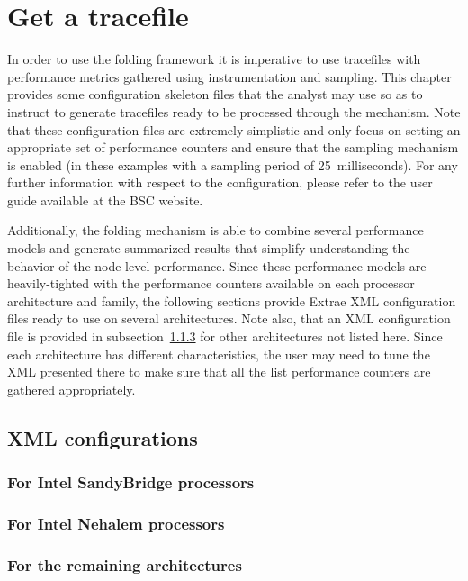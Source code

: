 \chapter{Get a tracefile}\label{cha:GetATrace}

In order to use the folding framework it is imperative to use tracefiles with performance metrics gathered using instrumentation and sampling.
This chapter provides some \TRACE configuration skeleton files that the analyst may use so as to instruct \TRACE to generate tracefiles ready to be processed through the \FOLDING mechanism.
Note that these configuration files are extremely simplistic and only focus on setting an appropriate set of performance counters and ensure that the sampling mechanism is enabled (in these examples with a sampling period of 25~milliseconds).
For any further information with respect to the \TRACE configuration, please refer to the \TRACE user guide available at the BSC website. 

Additionally, the folding mechanism is able to combine several performance models and generate summarized results that simplify understanding the behavior of the node-level performance.
Since these performance models are heavily-tighted with the performance counters available on each processor architecture and family, the following sections provide Extrae XML configuration files ready to use on several architectures.
Note also, that an XML configuration file is provided in subsection~\ref{subsec:OtherArchitectures} for other architectures not listed here.
Since each architecture has different characteristics, the user may need to tune the XML presented there to make sure that all the list performance counters are gathered appropriately.

\section{XML configurations}

\newpage

\subsection{For Intel SandyBridge processors}



\newpage

\subsection{For Intel Nehalem processors}



\newpage

\subsection{For the remaining architectures}\label{subsec:OtherArchitectures}



